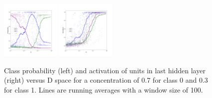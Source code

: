 \documentclass{article}
\begin{document}
\begin{figure}[H]
	\centering
	\includegraphics[width=0.25\textwidth]{DNN_D_vs_prob_6_2.png} \hspace*{-.5cm}
	\includegraphics[width=0.25\textwidth]{DNN_D_vs_act_6.png}   
	\caption{Class probability (left) and activation of units in last hidden layer (right) versus D space for a concentration of 0.7 for class 0 and 0.3 for class 1. Lines are running averages with a window size of 100.}
	\label{fig:Dspace}
\end{figure}
\end{document}
